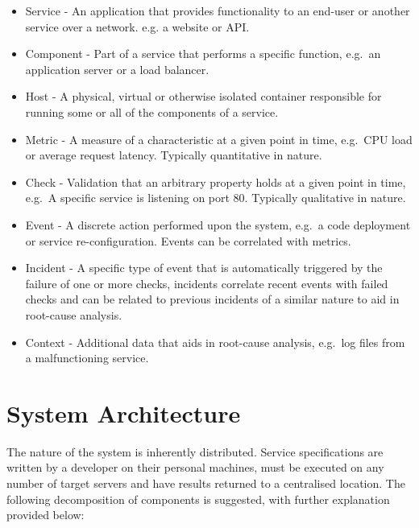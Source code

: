 \documentclass{cshonours}
\begin{document}
\begin{itemize}
  \item Service - An application that provides functionality to an end-user or another service over a network. e.g. a website or API.
  \item Component - Part of a service that performs a specific function, e.g.\ an application server or a load balancer.
  \item Host - A physical, virtual or otherwise isolated container responsible for running some or all of the components of a service.
  \item Metric - A measure of a characteristic at a given point in time, e.g.\ CPU load or average request latency. Typically quantitative in nature.
  \item Check - Validation that an arbitrary property holds at a given point in time, e.g.\ A specific service is listening on port 80. Typically qualitative in nature.
  \item Event - A discrete action performed upon the system, e.g.\ a code deployment or service re-configuration. Events can be correlated with metrics.
  \item Incident - A specific type of event that is automatically triggered by the failure of one or more checks, incidents correlate recent events with failed checks and can be related to previous incidents of a similar nature to aid in root-cause analysis.
  \item Context - Additional data that aids in root-cause analysis, e.g.\ log files from a malfunctioning service.
\end{itemize}

\pagebreak
\section{System Architecture}

\label{section:architecture}

The nature of the system is inherently distributed. Service specifications are written by a developer on their personal machines, must be executed on any number of target servers and have results returned to a centralised location. The following decomposition of components is suggested, with further explanation provided below:
\end{document}
